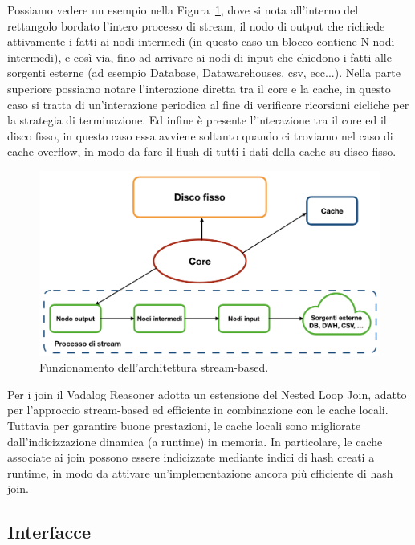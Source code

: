 Possiamo vedere un esempio nella Figura~\ref{fig:architettura_1}, dove si nota all'interno del rettangolo bordato l'intero processo di stream, il nodo di output che richiede attivamente i fatti ai nodi intermedi (in questo caso un blocco contiene N nodi intermedi), e così via, fino ad arrivare ai nodi di input che chiedono i fatti alle sorgenti esterne (ad esempio Database, Datawarehouses, csv, ecc...). \newline
Nella parte superiore possiamo notare l'interazione diretta tra il core e la cache, in questo caso si tratta di un'interazione periodica al fine di verificare ricorsioni cicliche per la strategia di terminazione. \newline
Ed infine è presente l'interazione tra il core ed il disco fisso, in questo caso essa avviene soltanto quando ci troviamo nel caso di cache overflow, in modo da fare il flush di tutti i dati della cache su disco fisso. 
\begin{figure}[h!]
	\centering
	\includegraphics[width=0.8\linewidth]{figure/architettura-1}
	\caption{Funzionamento dell'architettura stream-based.}
	\label{fig:architettura_1}
\end{figure}

Per i join il Vadalog Reasoner adotta un estensione del Nested Loop Join, adatto per l'approccio stream-based ed efficiente in combinazione con le cache locali. \newline
Tuttavia per garantire buone prestazioni, le cache locali sono migliorate dall'indicizzazione dinamica (a runtime) in memoria. In particolare, le cache associate ai join possono essere indicizzate mediante indici di hash creati a runtime, in modo da attivare un'implementazione ancora più efficiente di hash join.

\subsection{Interfacce}

